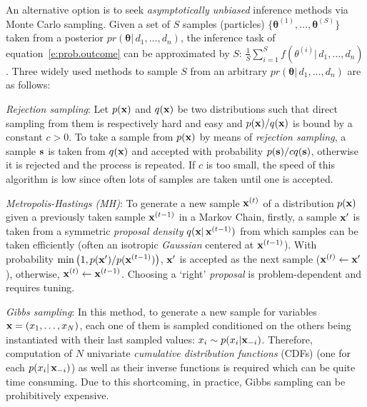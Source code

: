 An alternative option is to seek \emph{asymptotically unbiased} inference methods
via Monte Carlo sampling.
Given a set of $S$ samples (particles) $\{\boldsymbol\theta^{(1)}, \ldots, \boldsymbol\theta^{(S)}\}$ taken from a posterior $pr(\boldsymbol\theta | \, d_1, \ldots, d_n)$, 
the inference task of equation~\ref{e:prob.outcome} can be approximated by $S$: 
$\frac{1}{S} \sum_{i=1}^S f(\theta^{(i)} | \, d_1, \ldots, d_n)$.
Three widely used methods to sample $S$ from an arbitrary $pr(\boldsymbol\theta | \, d_1, \ldots, d_n)$ are as follows:

\emph{Rejection sampling}:
Let $p(\textbf{x})$ and $q(\textbf{x})$ be two distributions 
such that direct sampling from them is respectively hard and easy
and
$p(\textbf{x})/q(\textbf{x})$ is bound by a constant $c>0$. 
To take a sample from $p(\textbf{x})$ by means of \emph{rejection sampling}, 
a sample $\textbf{s}$ is taken from $q(\textbf{x})$ and accepted with probability $p(\textbf{s}) / c q(\textbf{s})$, 
otherwise it is rejected and the process is repeated. 
If $c$ is too small, the speed of this algorithm is low since often lots of samples are taken until one is accepted.

\emph{Metropolis-Hastings (MH)}:
To generate a new sample $\textbf{x}^{(t)}$ of a distribution $p(\textbf{x})$ given a previously taken sample $\textbf{x}^{(t-1)}$ in a Markov Chain, 
firstly, a sample $\textbf{x}'$ is taken 
from a symmetric \emph{proposal density} $q(\textbf{x} |\, \textbf{x}^{(t-1)})$ 
from which samples can be taken efficiently 
(often an isotropic \emph{Gaussian} centered at $\textbf{x}^{(t-1)}$). 
With probability $\min \big(1, p(\textbf{x}')/p(\textbf{x}^{(t-1)}) \big)$, 
$\textbf{x}'$ is accepted as the next sample ($\textbf{x}^{(t)} \leftarrow \textbf{x}'$), otherwise, $\textbf{x}^{(t)} \leftarrow \textbf{x}^{(t-1)}$. 
Choosing a `right' \emph{proposal} is problem-dependent and requires tuning. 


\emph{Gibbs sampling}:
In this method, to generate a new sample for variables $\textbf{x} = (x_1, \ldots, x_N)$, 
each one of them is sampled conditioned on the others being instantiated with their last sampled values:
$x_i \sim p(x_i | \textbf{x}_{-i})$. 
Therefore,  
computation of $N$ univariate \emph{cumulative distribution functions} (CDFs) 
(one for each $p(x_i | \, \textbf{x}_{-i})$) as well as their inverse functions is required which can be quite time consuming. 
Due to this shortcoming, in practice, Gibbs sampling can be prohibitively expensive.   

